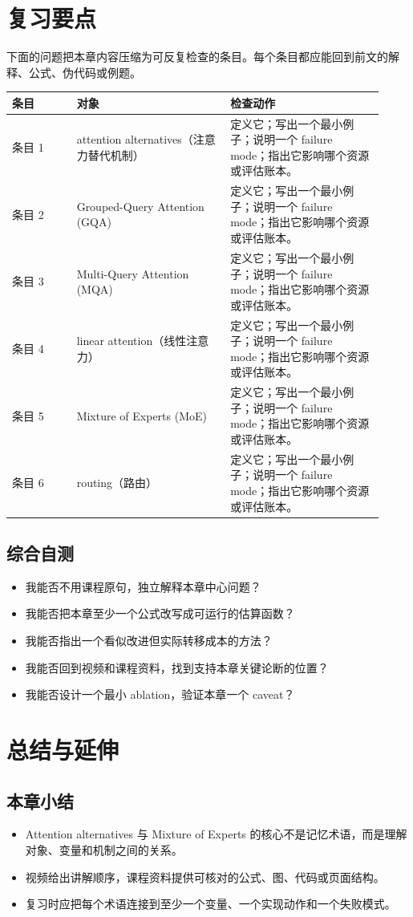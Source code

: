 \documentclass[a4paper]{article}
\begin{document}
\section{复习要点}
下面的问题把本章内容压缩为可反复检查的条目。每个条目都应能回到前文的解释、公式、伪代码或例题。
\begin{longtable}{p{0.16\linewidth}p{0.38\linewidth}p{0.38\linewidth}}
\toprule
\textbf{条目} & \textbf{对象} & \textbf{检查动作}\\
\midrule
条目 1 & attention alternatives（注意力替代机制） & 定义它；写出一个最小例子；说明一个 failure mode；指出它影响哪个资源或评估账本。\\
条目 2 & Grouped-Query Attention (GQA) & 定义它；写出一个最小例子；说明一个 failure mode；指出它影响哪个资源或评估账本。\\
条目 3 & Multi-Query Attention (MQA) & 定义它；写出一个最小例子；说明一个 failure mode；指出它影响哪个资源或评估账本。\\
条目 4 & linear attention（线性注意力） & 定义它；写出一个最小例子；说明一个 failure mode；指出它影响哪个资源或评估账本。\\
条目 5 & Mixture of Experts (MoE) & 定义它；写出一个最小例子；说明一个 failure mode；指出它影响哪个资源或评估账本。\\
条目 6 & routing（路由） & 定义它；写出一个最小例子；说明一个 failure mode；指出它影响哪个资源或评估账本。\\
\bottomrule
\end{longtable}
\subsection{综合自测}
\begin{itemize}
\item 我能否不用课程原句，独立解释本章中心问题？
\item 我能否把本章至少一个公式改写成可运行的估算函数？
\item 我能否指出一个看似改进但实际转移成本的方法？
\item 我能否回到视频和课程资料，找到支持本章关键论断的位置？
\item 我能否设计一个最小 ablation，验证本章一个 caveat？
\end{itemize}
\section{总结与延伸}
\subsection{本章小结}
\begin{itemize}
\item Attention alternatives 与 Mixture of Experts 的核心不是记忆术语，而是理解对象、变量和机制之间的关系。
\item 视频给出讲解顺序，课程资料提供可核对的公式、图、代码或页面结构。
\item 复习时应把每个术语连接到至少一个变量、一个实现动作和一个失败模式。
\end{itemize}
\end{document}
